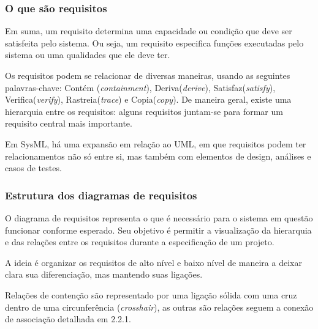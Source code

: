 
\subsubsection{O que são requisitos}

Em suma, um requisito determina uma capacidade ou condição que deve ser satisfeita pelo sistema. Ou seja, um requisito especifica funções executadas pelo sistema ou uma qualidades que ele deve ter.

Os requisitos podem se relacionar de diversas maneiras, usando as seguintes palavras-chave:  Contém (\textit{containment}), Deriva(\textit{derive}), Satisfaz(\textit{satisfy}), Verifica(\textit{verify}), Rastreia(\textit{trace}) e Copia(\textit{copy}). De maneira geral, existe uma hierarquia entre os requisitos: alguns requisitos juntam-se para formar um requisito central mais importante.

Em SysML, há uma expansão em relação ao UML, em que requisitos podem ter relacionamentos não só entre si, mas também com elementos de design, análises e casos de testes. 


\subsubsection{Estrutura dos diagramas de requisitos}
O diagrama de requisitos representa o que é necessário para o sistema em questão funcionar conforme esperado. Seu objetivo é permitir a visualização da hierarquia e das relações entre os requisitos durante a especificação de um projeto. 

A ideia é organizar os requisitos de alto nível e baixo nível de maneira a deixar clara sua diferenciação, mas mantendo suas ligações. 

 Relações de contenção são representado por uma ligação sólida com uma cruz dentro de uma circunferência (\textit{crosshair}), as outras são relações seguem a conexão de associação detalhada em 2.2.1.

